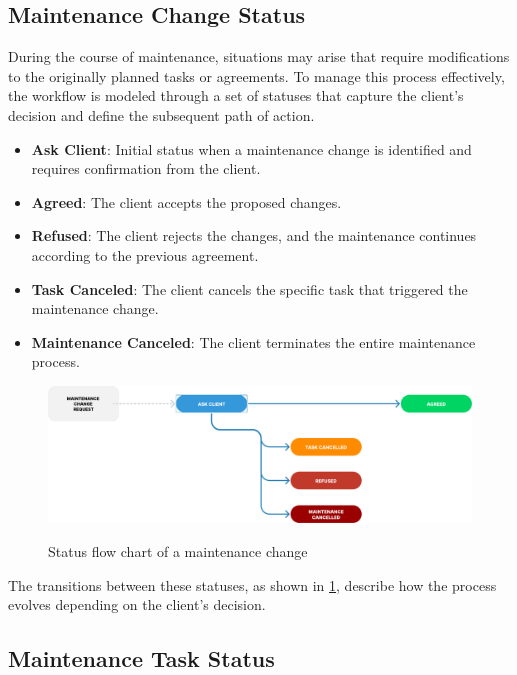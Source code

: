\subsection{Maintenance Change Status} 

During the course of maintenance, situations may arise that require modifications to the originally planned tasks or agreements. To manage this process effectively, the workflow is modeled through a set of statuses that capture the client's decision and define the subsequent path of action. 

\begin{itemize}
    \item \textbf{Ask Client}: Initial status when a maintenance change is identified and requires confirmation from the client.
    \item \textbf{Agreed}: The client accepts the proposed changes.
    \item \textbf{Refused}: The client rejects the changes, and the maintenance continues according to the previous agreement.
    \item \textbf{Task Canceled}: The client cancels the specific task that triggered the maintenance change.
    \item \textbf{Maintenance Canceled}: The client terminates the entire maintenance process.
\end{itemize}


\begin{figure}[h]
  \caption{Status flow chart of a maintenance change}
  \centering
  \includegraphics[width=\textwidth]{figs/Status/MaintenanceChange/StatusDiagram}
  \label{fig:maintenanceChangeFlowChart}
\end{figure}


The transitions between these statuses, as shown in \ref{fig:maintenanceChangeFlowChart}, describe how the process evolves depending on the client's decision.

\subsection{Maintenance Task Status} 

